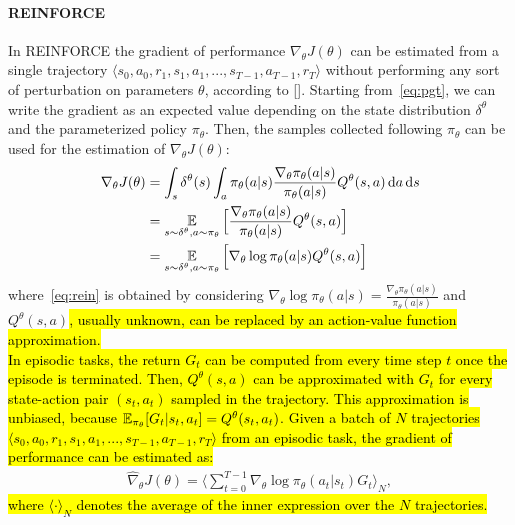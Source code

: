 \paragraph{REINFORCE} \label{subsec:rein}
In REINFORCE the gradient of performance $\nabla_{\theta}J(\theta)$ can be estimated from a single trajectory $\langle s_0, a_0, r_1, s_1, a_1, ..., s_{T-1}, a_{T-1}, r_{T} \rangle$ without performing any sort of perturbation on parameters $\theta$, according to [\cite{Williams1992SimpleSG}]. Starting from~\eqref{eq:pgt}, we can write the gradient as an expected value depending on the state distribution $\delta^{\theta}$ and the parameterized policy $\pi_{\theta}$. Then, the samples collected following $\pi_{\theta}$ can be used for the estimation of $\nabla_{\theta}J(\theta)$: 
\begin{align}
\nabla_{\theta}J(\theta) &= \int_s \delta^{\theta}(s) \int_a \pi_{\theta}(a|s) \frac{\nabla_{\theta} \pi_{\theta}(a|s)}{\pi_{\theta}(a|s)} Q^{\theta}(s,a) \,\mathrm{d} a \,\mathrm{d} s \nonumber\\
&= \operatorname*{\mathbb{E}}_{s \sim \delta^{\theta}, a \sim \pi_{\theta}} \Big[ \frac{\nabla_{\theta} \pi_{\theta}(a|s)}{\pi_{\theta}(a|s)} Q^{\theta}(s,a) \Big] \nonumber\\
&= \operatorname*{\mathbb{E}}_{s \sim \delta^{\theta}, a \sim \pi_{\theta}} \Big[ \nabla_{\theta} \log\pi_{\theta}(a|s) Q^{\theta}(s,a) \Big] \label{eq:rein}
\end{align}
where~\eqref{eq:rein} is obtained by considering $\nabla_{\theta} \log\pi_{\theta}(a|s) = \frac{\nabla_{\theta} \pi_{\theta}(a|s)}{\pi_{\theta}(a|s)}$ and $Q^{\theta}(s, a)$\hl{, usually unknown, can be replaced by an action-value function approximation.}\\
\newline
\hl{In episodic tasks, the return $G_t$ can be computed from every time step $t$ once the episode is terminated. Then, $Q^{\theta}(s, a)$ can be approximated with $G_{t}$ for every state-action pair $(s_t, a_t)$ sampled in the trajectory. This approximation is unbiased, because $\operatorname*{\mathbb{E}}_{\pi_{\theta}}[G_t | s_t, a_t] = Q^{\theta}(s_t, a_t)$.
Given a batch of $N$ trajectories $\langle s_0, a_0, r_1, s_1, a_1, ..., s_{T-1}, a_{T-1}, r_{T} \rangle$ from an episodic task, the gradient of performance can be estimated as:}
\begin{align}
	\widehat{\nabla}_{\theta}J(\theta) = \Big\langle \sum_{t=0}^{T-1} \nabla_{\theta} \log\pi_{\theta}(a_t|s_t) G_{t} \Big\rangle_{N}, \label{eq:estrein}
\end{align}
\hl{where $\langle \cdot \rangle_{N}$ denotes the average of the inner expression over the $N$ trajectories.}\\
